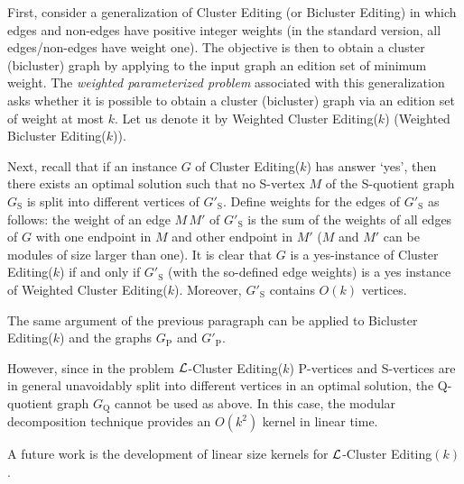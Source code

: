 \documentclass[12pt]{article}
\def\L{{\cal L}}
\begin{document}
First, consider a generalization of {\sc Cluster Editing} (or {\sc Bicluster Editing}) in which edges and non-edges have positive integer weights (in the standard version, all edges/non-edges have weight one). The objective is then to obtain a cluster (bicluster) graph by applying to the input graph an edition set of minimum weight. The {\it weighted parameterized problem} associated with this generalization asks whether it is possible to obtain a cluster (bicluster) graph via an edition set of weight at most $k$. Let us denote it by {\sc Weighted Cluster Editing($k$)} ({\sc Weighted Bicluster Editing($k$)}).

Next, recall that if an instance $G$ of {\sc Cluster Editing($k$)} has answer `yes', then there exists an optimal solution such that no S-vertex $M$ of the S-quotient graph $G_{\mathrm S}$ is split into different vertices of $G'_{\mathrm S}$. Define weights for the edges of $G'_{\mathrm S}$ as follows: the weight of an edge $M\,M'$ of $G'_{\mathrm S}$ is the sum of the weights of all edges of $G$ with one endpoint in $M$ and other endpoint in $M'$ ($M$ and $M'$ can be modules of size larger than one). It is clear that $G$ is a yes-instance of {\sc Cluster Editing($k$)} if and only if $G'_{\mathrm S}$ (with the so-defined edge weights) is a yes instance of {\sc Weighted Cluster Editing($k$)}. Moreover, $G'_{\mathrm S}$ contains $O(k)$ vertices.

The same argument of the previous paragraph can be applied to {\sc Bicluster Editing($k$)} and the graphs $G_{\mathrm P}$ and $G'_{\mathrm P}$.

However, since in the problem $\L${\sc -Cluster Editing($k$)} P-vertices and S-vertices are in general unavoidably split into different vertices in an optimal solution, the Q-quotient graph $G_{\mathrm Q}$ cannot be used as above. In this case, the modular decomposition technique provides an $O(k^2)$ kernel in linear time.

A future work is the development of linear size kernels for $\L${\sc -Cluster Editing$(k)$}.


\end{document}
